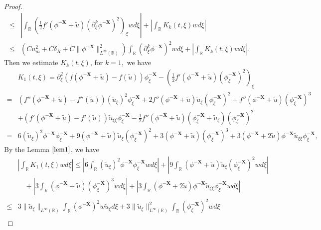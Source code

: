 \documentclass[10pt,reqno]{amsart}
\numberwithin{equation}{section}
\begin{document}
\begin{proof}
\begin{align*}
			\leq&\left|\int_{\mathbb{R}}\left(\frac{1}{2}f'(\phi^{-\mathbf{X}}+\tilde{u})(\partial_{\xi}^{k}\phi^{-\mathbf{X}})^{2}\right)_{\xi}wd\xi\right|+\left|\int_{\mathbb{R}}K_{k}(t,\xi)wd\xi\right|\\
			\leq&\left(Cu_m^2+C\delta_R+C\|\phi^{-\mathbf{X}}\|_{L^{\infty}(\mathbb{R})}^2\right)\int_{\mathbb{R}}(\partial_{\xi}^{k}\phi^{-\mathbf{X}})^{2}wd\xi+\left|\int_{\mathbb{R}}K_{k}(t,\xi)wd\xi\right|.
		\end{align*}
		Then we estimate $K_k(t,\xi)$, for $k=1,$ we have
		\begin{align*}
			&K_1(t,\xi)=\partial_{\xi}^{2}(f(\phi^{-\mathbf{X}}+\tilde{u})-f(\tilde{u}))\phi_{\xi}^{-\mathbf{X}}-(\frac{1}{2}f'(\phi^{-\mathbf{X}}+\tilde{u})(\phi_{\xi}^{-\mathbf{X}})^{2})_{\xi}\\
			=&(f''(\phi^{-\mathbf{X}}+\tilde{u})-f''(\tilde{u}))(\tilde{u}_{\xi})^{2}\phi_{\xi}^{-\mathbf{X}}+2f''(\phi^{-\mathbf{X}}+\tilde{u})\tilde{u}_{\xi}(\phi_{\xi}^{-\mathbf{X}})^{2}+f''(\phi^{-\mathbf{X}}+\tilde{u})(\phi_{\xi}^{-\mathbf{X}})^{3}\\
			&+(f'(\phi^{-\mathbf{X}}+\tilde{u})-f'(\tilde{u}))\tilde{u}_{\xi\xi}\phi_{\xi}^{-\mathbf{X}}-\frac{1}{2}f''(\phi^{-\mathbf{X}}+\tilde{u})(\phi_{\xi}^{-\mathbf{X}}+\tilde{u}_{\xi})(\phi_{\xi}^{-\mathbf{X}})^{2}\\
			=&6(\tilde{u}_{\xi})^2\phi^{-\mathbf{X}}\phi_{\xi}^{-\mathbf{X}}+9(\phi^{-\mathbf{X}}+\tilde{u})\tilde{u}_{\xi}(\phi_{\xi}^{-\mathbf{X}})^{2}+3(\phi^{-\mathbf{X}}+\tilde{u})(\phi_{\xi}^{-\mathbf{X}})^{3}+3(\phi^{-\mathbf{X}}+2\tilde{u})\phi^{-\mathbf{X}}\tilde{u}_{\xi\xi}\phi_{\xi}^{-\mathbf{X}},
		\end{align*}
		By the Lemma $\ref{lem1}$, we have
		\begin{align*}
			&\left|\int_{\mathbb{R}}K_1(t,\xi)wd\xi\right|
			\leq\left| 6\int_{\mathbb{R}}(\tilde{u}_{\xi})^2\phi^{-\mathbf{X}}\phi_{\xi}^{-\mathbf{X}}wd\xi\right|+\left|9\int_{\mathbb{R}}(\phi^{-\mathbf{X}}+\tilde{u})\tilde{u}_{\xi}(\phi_{\xi}^{-\mathbf{X}})^{2}wd\xi\right|\\
			&\quad+\left|3\int_{\mathbb{R}}(\phi^{-\mathbf{X}}+\tilde{u})(\phi_{\xi}^{-\mathbf{X}})^{3}wd\xi\right|+\left|3\int_{\mathbb{R}}(\phi^{-\mathbf{X}}+2\tilde{u})\phi^{-\mathbf{X}}\tilde{u}_{\xi\xi}\phi_{\xi}^{-\mathbf{X}}wd\xi\right|\\
			\leq&3\|\tilde{u}_{\xi}\|_{L^{\infty}(\mathbb{R})}\int_{\mathbb{R}}(\phi^{-\mathbf{X}})^2w\tilde{u}_{\xi}d\xi+3\|\tilde{u}_{\xi}\|_{L^{\infty}(\mathbb{R})}^2\int_{\mathbb{R}}(\phi_{\xi}^{-\mathbf{X}})^2wd\xi\\

\end{align*}
\end{proof}
\end{document}

